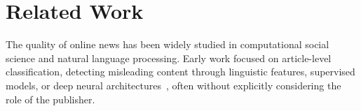 \documentclass[journal]{IEEEtran}
\begin{document}






\section{Related Work}

The quality of online news has been widely studied in computational social science and natural language processing. Early work focused on article-level classification, detecting misleading content through linguistic features, supervised models, or deep neural architectures~\cite{pandolfi2020automatic}, often without explicitly considering the role of the publisher.
\end{document}
